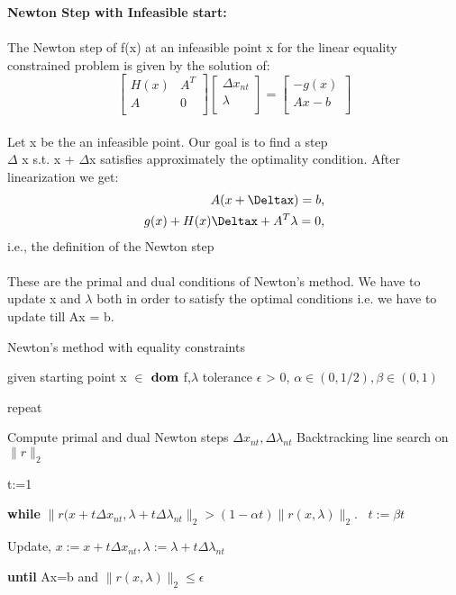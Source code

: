\documentclass[fleqn]{article}
\begin{document}
\newpage
{\bf Newton Step with Infeasible start:}
\\
\\
The Newton step of f(x) at an infeasible point x for the linear
equality constrained problem is given by the solution of:
\\
\[
\begin{bmatrix}
    H(x)       & A^T \\
    A       & 0 \\
\end{bmatrix}
\begin{bmatrix}
    \Delta x_{nt}       \\
    \lambda       \\
\end{bmatrix}
=
\begin{bmatrix}
    -g(x)\\
    Ax-b\\
\end{bmatrix}
\]
\\
Let x be the an infeasible point. Our goal is to find a step\\ $\Delta$ x s.t. x + $\Delta$x satisfies approximately the optimality condition. After linearization we get:
\begin{align*}
A(x + \Deltax) = b ,\\
g(x) + H(x)\Deltax + A^T \lambda = 0,
\end{align*}
i.e., the definition of the Newton step
\\
\\
These are the primal and dual conditions of Newton's method. We have to update x and $\lambda$ both in order to satisfy the optimal conditions i.e. we have to update till Ax = b.

\begin{algorithm}
\caption{Newton's method with equality constraints}
\begin{algorithmic}[1]
    \State given starting point x $\in$ $\bf{dom}$ f,$\lambda$ tolerance $\epsilon$ > 0, $\alpha \in (0, 1/2), \beta \in (0,1)$
    
    \State repeat 
    
    \State Compute primal and dual Newton steps $\Delta x_{nt}, \Delta \lambda_{nt} $
    \State Backtracking line search on $\parallel r \parallel_2$ 
    
    t:=1
    
    \textbf{while} $\parallel r(x + t\Delta x_{nt}, \lambda + t\Delta \lambda_{nt} \parallel_2 > (1 - \alpha t) \parallel r(x,\lambda) \parallel_2. \;\;\; t:=\beta t$
    
    \State Update, $x:= x+t\Delta x_{nt}, \lambda := \lambda + t \Delta \lambda_{nt}$
    
\textbf{until} Ax=b and $ \parallel r(x, \lambda) \parallel_2 \le \epsilon$
\end{algorithmic}
\end{algorithm}
\end{document}
